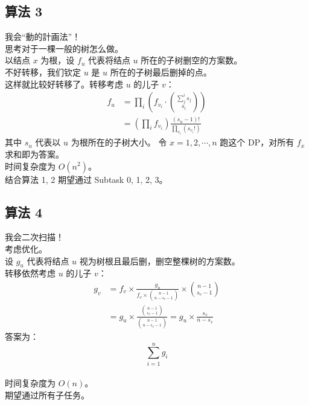 \documentclass[11pt, fontset = fandol]{ctexbeamer}
\begin{document}
\subsection{算法 3}
\begin{frame}
  \pause
  我会“動的計画法”！\\
  \pause
  思考对于一棵一般的树怎么做。\\
  \pause
  以结点 $x$ 为根，设 $f_u$ 代表将结点 $u$ 所在的子树删空的方案数。\\
  \pause
  不好转移，我们钦定 $u$ 是 $u$ 所在的子树最后删掉的点。\\
  \pause
  这样就比较好转移了。转移考虑 $u$ 的儿子 $v$：
  $$
  \begin{aligned}
    f_u &= \prod_{i} \left( f_{v_i} \cdot \binom{\sum_{j}^i s_j}{s_i} \right)\\
    &= \left(\prod_{i} f_{v_i} \right) \frac{(s_u - 1) !}{\prod_{{v_i}} (s_{v_i}!)}
  \end{aligned}
  $$
  其中 $s_u$ 代表以 $u$ 为根所在的子树大小。
  \pause
  令 $x = 1, 2, \cdots, n$ 跑这个 DP，对所有 $f_x$ 求和即为答案。\\
  时间复杂度为 $O\left(n^2\right)$。\\

  结合算法 1, 2 期望通过 Subtask 0, 1, 2, 3。\\
\end{frame}

\subsection{算法 4}
\begin{frame}
  \pause
  我会二次扫描！\\
  \pause
  考虑优化。\\
  \pause
  设 $g_u$ 代表将结点 $u$ 视为树根且最后删，删空整棵树的方案数。\\
  \pause
  转移依然考虑 $u$ 的儿子 $v$：\\
  $$
  \begin{aligned}
    g_v &= f_v \times \frac{g_u}{f_v \times \binom{n - 1}{n - s_v - 1}} \times \binom{n - 1}{s_v - 1}\\
    &= g_u \times \frac{\binom{n - 1}{s_v - 1}}{\binom{n - 1}{n - s_v - 1}} = g_u \times \frac{s_v}{n - s_v}
  \end{aligned}
  $$
  \pause
  答案为：$$\sum_{i=1}^n g_i$$\\
  \pause
  时间复杂度为 $O(n)$。\\
  期望通过所有子任务。
\end{frame}
\end{document}
